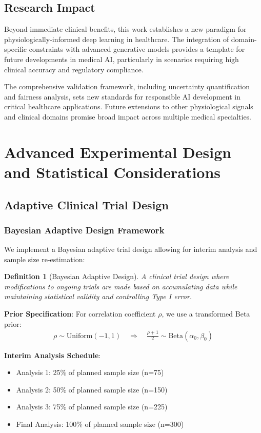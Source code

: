 \documentclass[11pt]{article}
\newtheorem{definition}{Definition}
\begin{document}
\subsection{Research Impact}
Beyond immediate clinical benefits, this work establishes a new paradigm for physiologically-informed deep learning in healthcare. The integration of domain-specific constraints with advanced generative models provides a template for future developments in medical AI, particularly in scenarios requiring high clinical accuracy and regulatory compliance.

The comprehensive validation framework, including uncertainty quantification and fairness analysis, sets new standards for responsible AI development in critical healthcare applications. Future extensions to other physiological signals and clinical domains promise broad impact across multiple medical specialties.

\section{Advanced Experimental Design and Statistical Considerations}
\label{sec:advanced_experimental}

\subsection{Adaptive Clinical Trial Design}

\subsubsection{Bayesian Adaptive Design Framework}
We implement a Bayesian adaptive trial design allowing for interim analysis and sample size re-estimation:

\begin{definition}[Bayesian Adaptive Design]
A clinical trial design where modifications to ongoing trials are made based on accumulating data while maintaining statistical validity and controlling Type I error.
\end{definition}

\textbf{Prior Specification}:
For correlation coefficient $\rho$, we use a transformed Beta prior:
\begin{align}
\rho \sim \text{Uniform}(-1, 1) \quad \Rightarrow \quad \frac{\rho + 1}{2} \sim \text{Beta}(\alpha_0, \beta_0)
\end{align}

\textbf{Interim Analysis Schedule}:
\begin{itemize}
    \item Analysis 1: 25\% of planned sample size (n=75)
    \item Analysis 2: 50\% of planned sample size (n=150)
    \item Analysis 3: 75\% of planned sample size (n=225)
    \item Final Analysis: 100\% of planned sample size (n=300)
\end{itemize}
\end{document}
